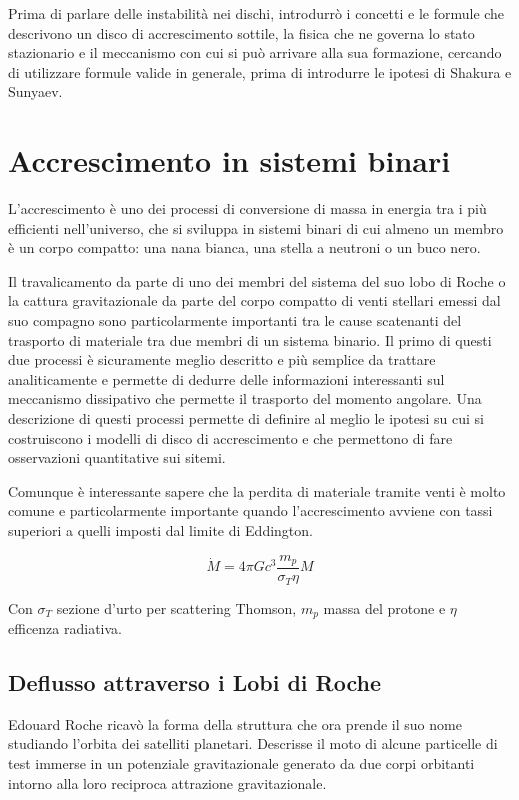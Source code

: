 \documentclass[a4paperbi]{article}
\begin{document}
	Prima di parlare delle instabilità nei dischi, introdurrò i concetti e le formule che descrivono un disco di accrescimento sottile, la fisica che ne governa lo stato stazionario e il meccanismo con cui si può arrivare alla sua formazione, cercando di utilizzare formule valide in generale, prima di introdurre le ipotesi di Shakura e Sunyaev.
	
\newpage
\section{Accrescimento in sistemi binari}
	L'accrescimento è uno dei processi di conversione di massa in energia tra i più efficienti nell'universo, che si sviluppa in sistemi binari di cui almeno un membro è un corpo compatto: una nana bianca, una stella a neutroni o un buco nero.

	Il travalicamento da parte di uno dei membri del sistema del suo lobo di Roche o la cattura gravitazionale da parte del corpo compatto di venti stellari emessi dal suo compagno sono particolarmente importanti tra le cause scatenanti del trasporto di materiale tra due membri di un sistema binario. Il primo di questi due processi è sicuramente meglio descritto e più semplice da trattare analiticamente e permette di dedurre delle informazioni interessanti sul meccanismo dissipativo che permette il trasporto del momento angolare. Una descrizione di questi processi permette di definire al meglio le ipotesi su cui si costruiscono i modelli di disco di accrescimento e che permettono di fare osservazioni quantitative sui sitemi.
	
	Comunque è interessante sapere che la perdita di materiale tramite venti è molto comune e particolarmente importante quando l'accrescimento avviene con tassi superiori a quelli imposti dal limite di Eddington.
	
	\begin{equation}
		\dot{M}=4\pi Gc^3\frac{m_p}{\sigma_T \eta}M
	\end{equation}
	
	Con $\sigma_T$ sezione d'urto per scattering Thomson, $m_p$ massa del protone e $\eta$ efficenza radiativa.

\subsection{Deflusso attraverso i Lobi di Roche}
	Edouard Roche ricavò la forma della struttura che ora prende il suo nome studiando l'orbita dei satelliti planetari. Descrisse il moto di alcune particelle di test immerse in un potenziale gravitazionale generato da due corpi orbitanti intorno alla loro reciproca attrazione gravitazionale.
	
\end{document}
